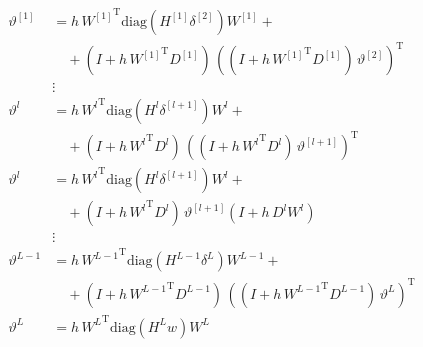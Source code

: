 \begin{align*}
    \vartheta^{[1]} & = h \, {W^{[1]}}^{\mathrm{T}} \mathrm{diag} \left( H^{[1]} \delta^{[2]} \right) W^{[1]} + \\
    & \quad + \left( I + h \, {W^{[1]}}^{\mathrm{T}} D^{[1]} \right) \, \left( \left( I + h \, {W^{[1]}}^{\mathrm{T}} D^{[1]} \right) \, \vartheta^{[2]} \right)^{\mathrm{T}} \\ 
    &\vdots\\
    \vartheta^{l} & = h \, {W^{l}}^{\mathrm{T}} \mathrm{diag} \left( H^{l} \delta^{[l+1]} \right) W^{l} + \\
    & \quad + \left( I + h \, {W^{l}}^{\mathrm{T}} D^{l} \right) \, \left( \left( I + h \, {W^{l}}^{\mathrm{T}} D^{l} \right) \, \vartheta^{[l+1]} \right)^{\mathrm{T}} \\ 
    \vartheta^{l} & = h \, {W^{l}}^{\mathrm{T}} \mathrm{diag} \left( H^{l} \delta^{[l+1]} \right) W^{l} + \\
    & \quad + \left( I + h \, {W^{l}}^{\mathrm{T}} D^{l} \right) \, \vartheta^{[l+1]}  \left( I + h \,  D^{l} {W^{l}} \right) \\ 
    &\vdots\\
    \vartheta^{L-1} & = h \, {W^{L-1}}^{\mathrm{T}} \mathrm{diag} \left( H^{L-1} \delta^{L} \right) W^{L-1} + \\
    & \quad + \left( I + h \, {W^{L-1}}^{\mathrm{T}} D^{L-1} \right) \, \left( \left( I + h \, {W^{L-1}}^{\mathrm{T}} D^{L-1} \right) \, \vartheta^{L} \right)^{\mathrm{T}} \\
    \vartheta^{L} &  = h \, {W^{L}}^{\mathrm{T}} \mathrm{diag}(H^{L} w) W^{L} 
\end{align*}

